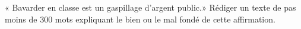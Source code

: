 
\begin{exercice}\label{exosmath-0428}

    « Bavarder en classe est un gaspillage d'argent public.» Rédiger un texte de pas moins de 300 mots expliquant le bien ou le mal fondé de cette affirmation.

\end{exercice}
